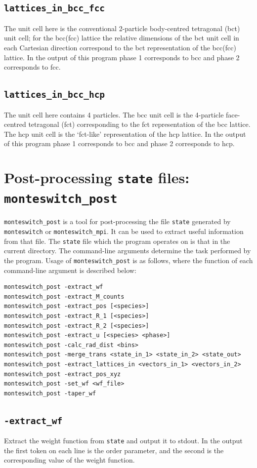 \documentclass{report}
\begin{document}
\subsection{\texttt{lattices\_in\_bcc\_fcc}}
The unit cell here is the conventional 2-particle body-centred tetragonal (bct) unit cell; for the bcc(fcc) lattice the relative dimensions of 
the bct unit cell in each Cartesian direction correspond to the bct representation of the bcc(fcc) lattice. In the output of this program
phase 1 corresponds to bcc and phase 2 corresponds to fcc.

\subsection{\texttt{lattices\_in\_bcc\_hcp}}
The unit cell here contains 4 particles. The bcc unit cell is the 4-particle face-centred tetragonal (fct) corresponding to the fct representation of 
the bcc lattice. The hcp unit cell is the `fct-like' representation of the hcp lattice. In the output of this program
phase 1 corresponds to bcc and phase 2 corresponds to hcp.


\section{Post-processing \texttt{state} files: \texttt{monteswitch\_post}}\label{sec:monteswitch_post}
\texttt{monteswitch\_post} is a tool for post-processing the file \texttt{state} generated by \texttt{monteswitch} or \texttt{monteswitch\_mpi}. It can
be used to extract useful information from that file. The \texttt{state} file which the program operates on is that in the current directory.
The command-line arguments determine the task performed by the program. Usage of \texttt{monteswitch\_post} is as follows, where the function 
of each command-line argument is described below:
\begin{verbatim}
monteswitch_post -extract_wf
monteswitch_post -extract_M_counts
monteswitch_post -extract_pos [<species>]
monteswitch_post -extract_R_1 [<species>]
monteswitch_post -extract_R_2 [<species>]
monteswitch_post -extract_u [<species> <phase>]
monteswitch_post -calc_rad_dist <bins>
monteswitch_post -merge_trans <state_in_1> <state_in_2> <state_out>
monteswitch_post -extract_lattices_in <vectors_in_1> <vectors_in_2>
monteswitch_post -extract_pos_xyz
monteswitch_post -set_wf <wf_file>
monteswitch_post -taper_wf
\end{verbatim}

\subsection{\texttt{-extract\_wf}}
Extract the weight function from \texttt{state} and output it to stdout. In the output the first token on each line is the order parameter, 
and the second is the corresponding value of the weight function.
\end{document}

